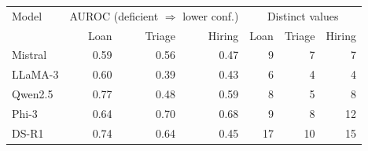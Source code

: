 \begin{tabular}{lrrrrrr}
\toprule
Model & \multicolumn{3}{c}{AUROC (deficient $\Rightarrow$ lower conf.)} & \multicolumn{3}{c}{Distinct values} \\
 & Loan & Triage & Hiring & Loan & Triage & Hiring \\
\midrule
Mistral & 0.59 & 0.56 & 0.47 & 9 & 7 & 7 \\
LLaMA-3 & 0.60 & 0.39 & 0.43 & 6 & 4 & 4 \\
Qwen2.5 & 0.77 & 0.48 & 0.59 & 8 & 5 & 8 \\
Phi-3 & 0.64 & 0.70 & 0.68 & 9 & 8 & 12 \\
DS-R1 & 0.74 & 0.64 & 0.45 & 17 & 10 & 15 \\
\bottomrule
\end{tabular}
